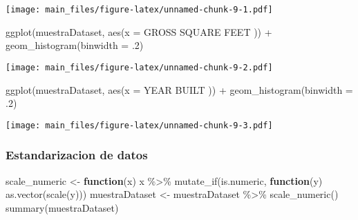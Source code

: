 \documentclass[
]{article}
\newenvironment{Shaded}{\begin{snugshade}}{\end{snugshade}}
\newcommand{\AttributeTok}[1]{\textcolor[rgb]{0.77,0.63,0.00}{#1}}
\newcommand{\ControlFlowTok}[1]{\textcolor[rgb]{0.13,0.29,0.53}{\textbf{#1}}}
\newcommand{\DecValTok}[1]{\textcolor[rgb]{0.00,0.00,0.81}{#1}}
\newcommand{\FunctionTok}[1]{\textcolor[rgb]{0.00,0.00,0.00}{#1}}
\newcommand{\NormalTok}[1]{#1}
\newcommand{\OtherTok}[1]{\textcolor[rgb]{0.56,0.35,0.01}{#1}}
\newcommand{\SpecialCharTok}[1]{\textcolor[rgb]{0.00,0.00,0.00}{#1}}
\newcommand{\StringTok}[1]{\textcolor[rgb]{0.31,0.60,0.02}{#1}}
\begin{document}
\texttt{[image: main\_files/figure-latex/unnamed-chunk-9-1.pdf]}

\begin{Shaded}
\begin{Highlighting}[]
\FunctionTok{ggplot}\NormalTok{(muestraDataset, }\FunctionTok{aes}\NormalTok{(}\AttributeTok{x =} \StringTok{\textasciigrave{}}\AttributeTok{GROSS SQUARE FEET}\StringTok{\textasciigrave{}}\NormalTok{ )) }\SpecialCharTok{+} \FunctionTok{geom\_histogram}\NormalTok{(}\AttributeTok{binwidth =}\NormalTok{ .}\DecValTok{2}\NormalTok{)}
\end{Highlighting}
\end{Shaded}

\texttt{[image: main\_files/figure-latex/unnamed-chunk-9-2.pdf]}

\begin{Shaded}
\begin{Highlighting}[]
\FunctionTok{ggplot}\NormalTok{(muestraDataset, }\FunctionTok{aes}\NormalTok{(}\AttributeTok{x =} \StringTok{\textasciigrave{}}\AttributeTok{YEAR BUILT}\StringTok{\textasciigrave{}}\NormalTok{ )) }\SpecialCharTok{+} \FunctionTok{geom\_histogram}\NormalTok{(}\AttributeTok{binwidth =}\NormalTok{ .}\DecValTok{2}\NormalTok{)}
\end{Highlighting}
\end{Shaded}

\texttt{[image: main\_files/figure-latex/unnamed-chunk-9-3.pdf]}

\hypertarget{estandarizacion-de-datos}{%
\subsubsection{Estandarizacion de
datos}\label{estandarizacion-de-datos}}

\begin{Shaded}
\begin{Highlighting}[]
\NormalTok{scale\_numeric }\OtherTok{\textless{}{-}} \ControlFlowTok{function}\NormalTok{(x) x }\SpecialCharTok{\%\textgreater{}\%} \FunctionTok{mutate\_if}\NormalTok{(is.numeric, }\ControlFlowTok{function}\NormalTok{(y) }\FunctionTok{as.vector}\NormalTok{(}\FunctionTok{scale}\NormalTok{(y)))}
\NormalTok{muestraDataset }\OtherTok{\textless{}{-}}\NormalTok{ muestraDataset }\SpecialCharTok{\%\textgreater{}\%} \FunctionTok{scale\_numeric}\NormalTok{()}
\FunctionTok{summary}\NormalTok{(muestraDataset)}
\end{Highlighting}
\end{Shaded}
\end{document}
